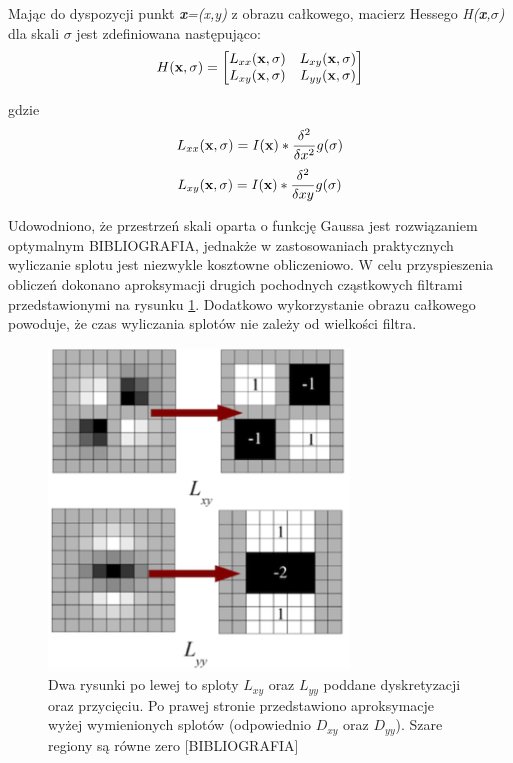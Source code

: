 
Mając do dyspozycji punkt \textit{\textbf{x}=(x,y)} z obrazu całkowego, macierz Hessego \textit{H(\textbf{x},$\sigma$)} dla skali $\sigma$ jest zdefiniowana następująco:
\begin{equation}\textsl{}
H(\textbf{x},\sigma) = 
\begin{bmatrix}
L_{xx}(\textbf{x},\sigma) & L_{xy}(\textbf{x},\sigma) \\ L_{xy}(\textbf{x},\sigma) & L_{yy}(\textbf{x},\sigma)
\end{bmatrix}
\end{equation}

gdzie 
\begin{equation}\textsl{}
L_{xx}(\textbf{x},\sigma) = I(\textbf{x})*\frac{\delta^2}{\delta x^2}g(\sigma)
\end{equation}
\begin{equation}\textsl{}
L_{xy}(\textbf{x},\sigma) = I(\textbf{x})*\frac{\delta^2}{\delta xy}g(\sigma)
\end{equation}

Udowodniono, że przestrzeń skali oparta o funkcję Gaussa jest rozwiązaniem optymalnym {BIBLIOGRAFIA}, jednakże w zastosowaniach praktycznych wyliczanie splotu jest niezwykle kosztowne obliczeniowo. W celu przyspieszenia obliczeń dokonano aproksymacji drugich pochodnych cząstkowych filtrami przedstawionymi na rysunku \ref{im: GaussianApproximation}. Dodatkowo wykorzystanie obrazu całkowego powoduje, że czas wyliczania splotów nie zależy od wielkości filtra. 
\begin{figure}[h]
	\includegraphics[width=8cm]{SurfLxyLyy}
	\centering
	\caption{Dwa rysunki po lewej to sploty \textit{$L_{xy}$} oraz \textit{$L_{yy}$} poddane dyskretyzacji oraz przycięciu. Po prawej stronie przedstawiono aproksymacje wyżej wymienionych splotów (odpowiednio \textit{$D_{xy}$} oraz \textit{$D_{yy}$}). Szare regiony są równe zero [BIBLIOGRAFIA]}
	\label{im: GaussianApproximation}
\end{figure}

